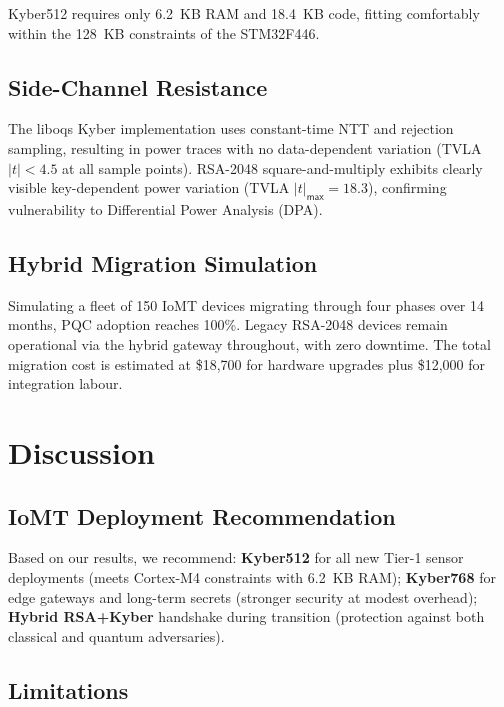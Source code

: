 \documentclass[10pt,journal,compsoc]{IEEEtran}
\begin{document}
Kyber512 requires only 6.2~KB RAM and 18.4~KB code, fitting
comfortably within the 128~KB constraints of the STM32F446.

\subsection{Side-Channel Resistance}
\label{sec:sidechannel}

The liboqs Kyber implementation uses constant-time NTT and
rejection sampling, resulting in power traces with no
data-dependent variation (TVLA $|t| < 4.5$ at all sample points).
RSA-2048 square-and-multiply exhibits clearly visible key-dependent
power variation (TVLA $|t|_\mathsf{max} = 18.3$),
confirming vulnerability to Differential Power Analysis (DPA).

\subsection{Hybrid Migration Simulation}
\label{sec:migration}

Simulating a fleet of 150 IoMT devices migrating through four
phases over 14 months, PQC adoption reaches 100\%.
Legacy RSA-2048 devices remain operational via the hybrid gateway
throughout, with zero downtime.
The total migration cost is estimated at \$18,700 for
hardware upgrades plus \$12,000 for integration labour.

\section{Discussion}
\label{sec:discussion}

\subsection{IoMT Deployment Recommendation}

Based on our results, we recommend:
\textbf{Kyber512} for all new Tier-1 sensor deployments
(meets Cortex-M4 constraints with 6.2~KB RAM);
\textbf{Kyber768} for edge gateways and long-term secrets
(stronger security at modest overhead);
\textbf{Hybrid RSA+Kyber} handshake during transition
(protection against both classical and quantum adversaries).

\subsection{Limitations}
\end{document}
